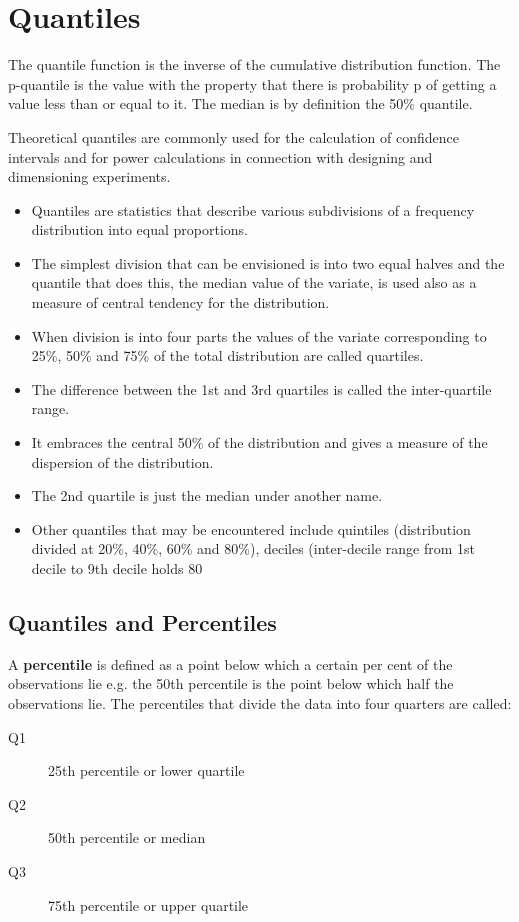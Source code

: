﻿\documentclass[]{report}
\begin{document}
\section{Quantiles}
 The quantile function is the inverse of the cumulative
 distribution function. The p-quantile is the value with the
 property that there is probability p of getting a value less than
 or equal to it. The median is by definition the 50\% quantile.
 
 Theoretical quantiles are commonly used for the calculation of
 confidence intervals and for power calculations in connection with
 designing and dimensioning experiments.
\begin{itemize}
\item Quantiles are statistics that describe various subdivisions of a frequency distribution into equal proportions. 
\item The simplest division that can be envisioned is into two equal halves and the quantile that does this, the 
median value of the variate, is used also as a measure of central tendency for the distribution.

\item When division is into four parts the values of the variate corresponding to 25\%, 50\% and 75\% of the total 
distribution are called quartiles.\item The difference between the 1st and 3rd quartiles is called the inter-quartile range. 
\item It embraces the central 50\% of the distribution and gives a measure of the dispersion of the distribution. 
\item The 2nd quartile is just the median under another name.
\end{itemize}

\begin{itemize}
\item Other quantiles that may be encountered include quintiles (distribution divided at 20\%, 40\%, 60\% and 80\%), 
deciles (inter-decile range from 1st decile to 9th decile holds 80%
\end{itemize}


\subsection{Quantiles and Percentiles}

A \textbf{percentile} is defined as a point below which a certain per cent of the observations lie e.g. the 50th percentile is the point below which half the observations lie. The percentiles that divide the data into four quarters are called: 
\begin{description}
\item[Q1] 25th percentile or lower quartile
\item[Q2] 50th percentile or median
\item[Q3] 75th percentile or upper quartile
\end{description}
\end{document}
